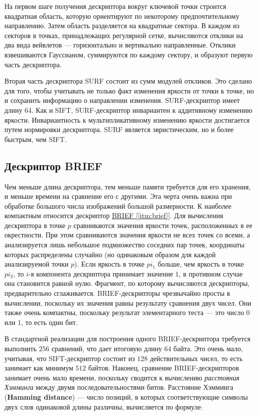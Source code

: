 На первом шаге получения дескриптора вокруг ключевой точки строится квадратная область, которую ориентируют по некоторому предпочтительному направлению. Затем область разделяется на квадратные сектора. В каждом из секторов в точках, принадлежащих регулярной сетке, вычисляются отклики на два вида вейвлетов — горизонтально и вертикально направленные. Отклики взвешиваются Гауссианом, суммируются по каждому сектору, и образуют первую часть дескриптора.

Вторая часть дескриптора SURF состоит из сумм модулей откликов. Это сделано для того, чтобы учитывать не только факт изменения яркости от точки к точке, но и сохранить информацию о направлении изменения. SURF-дескриптор имеет длину 64. Как и SIFT, SURF-дескриптор инвариантен к аддитивному изменению яркости. Инвариантность к мультипликативному изменению яркости достигается путем нормировки дескриптора. SURF является эвристическим, но и более быстрым, чем SIFT.

\subsection{Дескриптор BRIEF}

Чем меньше длина дескриптора, тем меньше памяти требуется для его хранения, и меньше времени на сравнение его с другими. Эта черта очень важна при обработке большого числа изображений большой размерности. К наиболее компактным относится дескриптор \hyperref[itm:brief]{ BRIEF [\ref{itm:brief}]}. Для вычисления дескриптора в точке $p$ сравниваются значения яркости точек, расположенных в ее окрестности. При этом сравниваются значения яркости не всех точек со всеми, а анализируется лишь небольшое подмножество соседних пар точек, координаты которых распределены случайно (но одинаковым образом для каждой анализируемой точки $p$). Если яркость в точке $pi_1$ больше, чем яркость в точке $pi_2$, то $i$-я компонента дескриптора принимает значение $1$, в противном случае она становится равной нулю. Фрагмент, по которому вычисляются дескрипторы, предварительно сглаживается. BRIEF-дескрипторы чрезвычайно просты в вычислении, поскольку их значения равны результату сравнения двух чисел. Они также очень компактны, поскольку результат элементарного теста — это число $0$ или $1$, то есть один бит.

В стандартной реализации для построения одного BRIEF-дескриптора требуется выполнить $256$ сравнений, что дает итоговую длину $64$ байта. Это очень мало, учитывая, что SIFT-дескриптор состоит из $128$ действительных чисел, то есть занимает как минимум $512$ байтов. Наконец, сравнение BRIEF-дескрипторов занимает очень мало времени, поскольку сводится к вычислению \textit{расстояния Хэмминга} между двумя последовательностями битов. Расстояние Хэмминга (\textbf{Hamming distance}) — число позиций, в которых соответствующие символы двух слов одинаковой длины различны, вычисляется по формуле:

